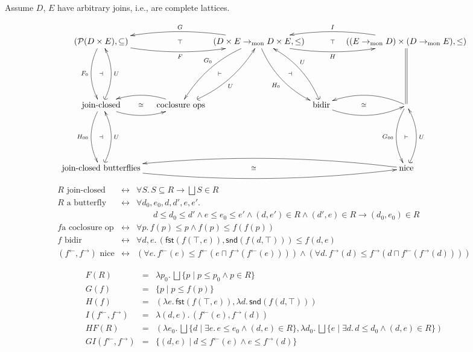 \documentclass[9pt]{article}
\newcommand{\Pow}{\mathcal{P}}
\newcommand{\tomon}{\to_{\mathrm{mon}}}
\newcommand{\ff}{{f^{\rightarrow}}}
\newcommand{\fb}{{f^{\leftarrow}}}
\newcommand{\bigjoin}{\bigsqcup}
\newcommand{\meet}{\sqcap}
\newcommand{\con}{\wedge}
\newcommand{\imp}{\to}
\newcommand{\equ}{\leftrightarrow}
\newcommand{\fst}{\mathsf{fst}}
\newcommand{\snd}{\mathsf{snd}}
\begin{document}
Assume $D$, $E$ have arbitrary joins, i.e., are complete lattices. 

\[
\xymatrix@R=5pc@C=0.3pc{  
  (\Pow(D \times E), \subseteq) \ar@/_1pc/[rrr]_{F} \ar@{}[rrr]|{\top}
  \ar@/_1pc/[d]_{F_0}  \ar@{}[d]|{\dashv}
& & & (D \times E \tomon D \times E, \leq) \ar@/_1pc/[rrr]_{H} \ar@{}[rrr]|{\top}
\ar@/_1pc/[lll]_{G}
\ar@/_1pc/[dl]_{G_0} \ar@{}[dl]|{\vdash}
\ar@/_1pc/[dr]_{H_0} \ar@{}[dr]|{\dashv}
& & & ((E \tomon D) \times (D \tomon E), \leq) \ar@/_1pc/[lll]_{I}
   \ar@{=}[d] \\
\textrm{join-closed} \ar@/_1pc/[rr] \ar@{}[rr]|{\cong}
        \ar@/_1pc/[d]_{H_{00}} \ar@{}[d]|{\dashv} \ar@{(->}@/_1pc/[u]_{U}
& & \textrm{coclosure ops} \ar@/_1pc/[ll]  \ar@{(->}@/_1pc/[ur]_{U}
    & & \textrm{bidir} \ar@/_1pc/[rr] \ar@{}[rr]|{\cong}  \ar@{(->}@/_1pc/[ul]_U
    & &  \ar@/_1pc/[ll] \ar@/_1pc/[d]_{G_{00}}  \ar@{}[d]|{\vdash} \\
\textrm{join-closed butterflies} \ar@/_1pc/[rrrrrr] \ar@{}[rrrrrr]|{\cong}
         \ar@{(->}@/_1pc/[u]_{U}
& & & & & & \textrm{nice} \ar@/_1pc/[llllll]
  \ar@{(->}@/_1pc/[u]_{U}
}
\]  



\begin{eqnarray*}
  R \textrm{~join-closed}
  & \equ & \forall S.\, S \subseteq R \imp \bigjoin S \in R \\
  R \textrm{~a butterfly}
  & \equ & \forall d_0,e_0,d,d',e,e'.\, \\
  & & \qquad
        d \leq d_0 \leq d' \con e \leq e_0 \leq e'
           \con (d,e') \in R \con (d',e) \in R \imp (d_0,e_0) \in R \\
  f \textrm{a coclosure op}
  & \equ & \forall p.\, f(p) \leq p \con f(p) \leq f(f(p)) \\
  f \textrm{~bidir}
  & \equ & \forall d,e.\, (\fst(f(\top,e)),\snd(f(d,\top))) \leq f(d,e) \\
  (\fb,\ff) \textrm{~nice}
  & \equ & (\forall e.\, \fb(e) \leq \fb(e \meet \ff(\fb(e))))
           \con (\forall d.\, \ff(d) \leq \ff(d \meet \fb(\ff(d))))
\end{eqnarray*}  

\begin{eqnarray*}
  F(R) & = &
    \lambda p_0.\, \bigjoin \{p \mid p \leq p_0 \con p \in R\} \\        
  G(f) & = & \{p \mid p \leq f(p)\} \\
  H(f) & = &
    (\lambda e.\, \fst(f(\top,e)), \lambda d.\, \snd(f(d,\top))) \\         
  I(\fb,\ff) & = & \lambda (d,e).\, (\fb(e),\ff(d)) \\
  HF(R) & = &
    (\lambda e_0.\, \bigjoin\{d \mid \exists e.\, e \leq e_0 \con (d,e) \in R\},
    \lambda d_0.\, \bigjoin \{e \mid \exists d.\, d \leq d_0 \con (d,e) \in R\}) \\
  GI(\fb,\ff) & = &
                    \{ (d,e) \mid d \leq \fb(e) \con e \leq \ff(d)\} 
\end{eqnarray*}
\end{document}
